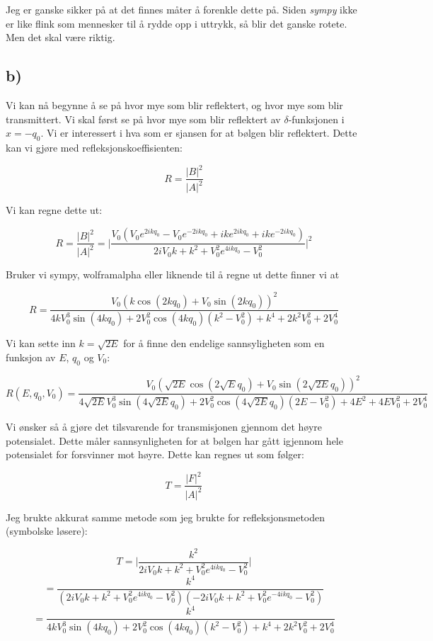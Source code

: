 \documentclass[a4paper,norsk, 10pt]{article}
\numberwithin{equation}{section}
\begin{document}
Jeg er ganske sikker på at det finnes måter å forenkle dette på. Siden \textit{sympy} ikke er like flink som mennesker til å rydde opp i uttrykk, så blir det ganske rotete. Men det skal være riktig.


\subsection*{b)}

Vi kan nå begynne å se på hvor mye som blir reflektert, og hvor mye som blir transmittert. Vi skal først se på hvor mye som blir reflektert av $\delta$-funksjonen i $x = -q_0$. Vi er interessert i hva som er sjansen for at bølgen blir reflektert. Dette kan vi gjøre med refleksjonskoeffisienten:

\begin{equation}
R = \frac{|B|^2}{|A|^2}
\label{eq:refleks}
\end{equation}

Vi kan regne dette ut:

$$
R = \frac{|B|^2}{|A|^2} = \bigg|\frac{V_0\left(V_0e^{2ikq_0} - V_0e^{-2ikq_0} + ike^{2ikq_0} + ike^{-2ikq_0}\right)}{2iV_0k + k^2 +V_0^2e^{4ikq_0} - V_0^2}\bigg|^2
$$

Bruker vi sympy, wolframalpha eller liknende til å regne ut dette finner vi at 

$$
R = \frac{V_0\left(k\cos(2kq_0) + V_0\sin(2kq_0)\right)^2}{4kV_0^3\sin(4kq_0) + 2V_0^2\cos(4kq_0)(k^2 - V_0^2)+k^4 +2k^2V_0^2 + 2V_0^4}
$$

Vi kan sette inn $k = \sqrt{2E}$ for å finne den endelige sannsyligheten som en funksjon av $E$, $q_0$ og $V_0$:

$$
R(E,q_0,V_0) = \frac{V_0\left(\sqrt{2E}\cos(2\sqrt{E}q_0) + V_0\sin(2\sqrt{2E} q_0)\right)^2}{4\sqrt{2E}V_0^3\sin(4\sqrt{2E} q_0) + 2V_0^2\cos(4\sqrt{2E} q_0)(2E - V_0^2)+4E^2 +4EV_0^2 + 2V_0^4}
$$

Vi ønsker så å gjøre det tilsvarende for transmisjonen gjennom det høyre potensialet. Dette måler sannsynligheten for at bølgen har gått igjennom hele potensialet for forsvinner mot høyre. Dette kan regnes ut som følger:

\begin{equation}
T = \frac{|F|^2}{|A|^2}
\label{eq:transmit}
\end{equation}

Jeg brukte akkurat samme metode som jeg brukte for refleksjonsmetoden (symbolske løsere):

$$
T = \bigg|\frac{k^2}{2iV_0k + k^2 +V_0^2e^{4ikq_0} - V_0^2}\bigg| 
$$
$$
= \frac{k^4}{(2iV_0k + k^2 +V_0^2e^{4ikq_0} - V_0^2)(-2iV_0k + k^2 +V_0^2e^{-4ikq_0} - V_0^2)}
$$
$$
 = \frac{k^4}{4kV_0^3\sin(4kq_0) + 2V_0^2\cos(4kq_0)(k^2 - V_0^2)+k^4 +2k^2V_0^2 + 2V_0^4}
$$
\end{document}
